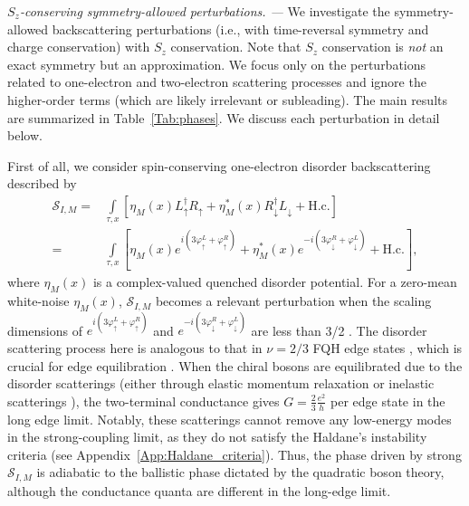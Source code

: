 \documentclass[aps,prx,amsmath,superscriptaddress,twocolumn,bibnotes,longbibliography,floatfix]{revtex4-2}
\begin{document}
	\textit{$S_z$-conserving symmetry-allowed perturbations. ---} We investigate the symmetry-allowed backscattering perturbations (i.e., with time-reversal symmetry and charge conservation) with $S_z$ conservation. Note that $S_z$ conservation is \textit{not} an exact symmetry but an approximation. We focus only on the perturbations related to one-electron and two-electron scattering processes and ignore the higher-order terms (which are likely irrelevant or subleading). The main results are summarized in Table~\ref{Tab:phases}. We discuss each perturbation in detail below.


	First of all, we consider spin-conserving one-electron disorder backscattering described by
	\begin{subequations}\label{Eq:S_I_M}
		\begin{align}
			\mathcal{S}_{I,M}\!=&\!\int\limits_{\tau,x} \left[\eta_M(x)L^{\dagger}_{\uparrow}R_{\uparrow}+\eta_M^*(x)R^{\dagger}_{\downarrow}L_{\downarrow}+\text{H.c.}\right]\\
			=&\!\int\limits_{\tau,x} \left[\eta_M(x)e^{i(3\varphi^L_{\uparrow}+\varphi^R_{\uparrow})}+\eta_M^*(x)e^{-i(3\varphi^R_{\downarrow}+\varphi^L_{\downarrow})}+\text{H.c.}\right],
		\end{align}
	\end{subequations}
	where $\eta_M(x)$ is a complex-valued quenched disorder potential. For a zero-mean white-noise $\eta_M(x)$, $\mathcal{S}_{I,M}$ becomes a relevant perturbation when the scaling dimensions of $e^{i(3\varphi^L_{\uparrow}+\varphi^R_{\uparrow})}$ and $e^{-i(3\varphi^R_{\downarrow}+\varphi^L_{\downarrow})}$ are less than 3/2 \cite{GiamarchiT1988,GiamarchiT2003}. The disorder scattering process here is analogous to that in $\nu=2/3$ FQH edge states \cite{KaneCL1994,KaneCL1995,KaneCL1995a}, which is crucial for edge equilibration \cite{KaneCL1994,KaneCL1995,KaneCL1995a,ProtopopovIV2017,NosigliaC2018}. When the chiral bosons are equilibrated due to the disorder scatterings (either through elastic momentum relaxation \cite{KaneCL1994,NosigliaC2018} or inelastic scatterings \cite{ProtopopovIV2017}), the two-terminal conductance gives $G=\frac{2}{3}\frac{e^2}{h}$ per edge state in the long edge limit. Notably, these scatterings cannot remove any low-energy modes in the strong-coupling limit, as they do not satisfy the Haldane's instability criteria \cite{HaldaneFDM1995} (see Appendix~\ref{App:Haldane_criteria}). Thus, the phase driven by strong $\mathcal{S}_{I,M}$ is adiabatic to the ballistic phase dictated by the quadratic boson theory, although the conductance quanta are different in the long-edge limit.
\end{document}
